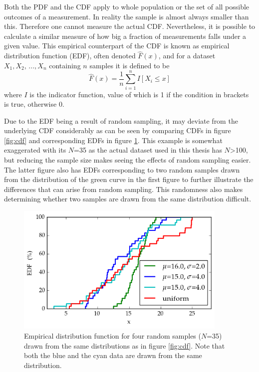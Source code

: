 \documentclass[english, oneside]{HYgradu}
\begin{document}
\reversemarginpar
{}
Both the PDF and the CDF apply to whole population or the set of all possible outcomes of a measurement. In reality the sample is almost always smaller than this. Therefore one cannot measure the actual CDF. Nevertheless, it is possible to calculate a similar measure of how big a fraction of measurements falls under a given value. This empirical counterpart of the CDF is known as empirical distribution function (EDF), often denoted $\hat F(x)$, and for a dataset $X_1, X_2,\,..., X_n$ containing $n$ samples it is defined to be
\begin{equation}
	\hat F(x) = \frac{1}{n}\sum_{i=1}^n I[X_i \leq x]
\end{equation}
where $I$ is the indicator function, value of which is 1 if the condition in brackets is true, otherwise 0. \citep{feigelson2012modern}

\reversemarginpar
{}
Due to the EDF being a result of random sampling, it may deviate from the underlying CDF considerably as can be seen by comparing CDFs in figure \ref{fig:cdf} and corresponding EDFs in figure \ref{fig:edf}. This example is somewhat exaggerated with its $N$=35 as the actual dataset used in this thesis has $N$>100, but reducing the sample size makes seeing the effects of random sampling easier. The latter figure also has EDFs corresponding to two random samples drawn from the distribution of the green curve in the first figure to further illustrate the differences that can arise from random sampling. This randomness also makes determining whether two samples are drawn from the same distribution difficult.

\begin{figure}
   \centering
   \includegraphics[width=0.9\textwidth]{kuvat/edf.png}
   \caption{Empirical distribution function for four random samples ($N$=35) drawn from the same distributions as in figure \ref{fig:cdf}. Note that both the blue and the cyan data are drawn from the same distribution.}
   \label{fig:edf}
\end{figure}
\end{document}
